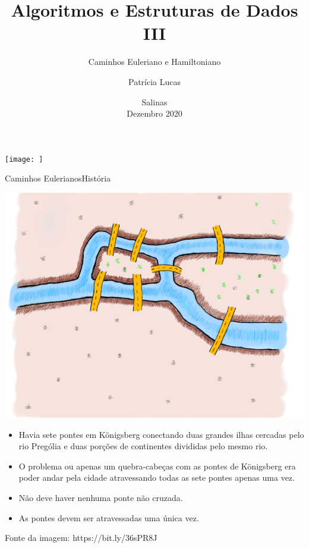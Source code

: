 \documentclass[t]{beamer}
\title[]{Algoritmos e Estruturas de Dados III}
\subtitle[]{Caminhos Euleriano e Hamiltoniano}
\author[]{Patrícia Lucas\\{\footnotesize }}
\institute{Bacharelado em Sistemas de Informação \\ IFNMG  - Campus Salinas}
\date{\scriptsize Salinas\\Dezembro 2020}
\begin{document}
\begin{frame}

\begin{center}
\texttt{[image: ]}
\end{center}
  \titlepage
\end{frame}



\begin{ftst}{Caminhos Eulerianos}{História}
\vone
\vone
\begin{minipage}{.5\textwidth}
    \centering
    \justifying
    \includegraphics[scale=0.23]{Figuras/euleriano_1.png}
\end{minipage}%
\hfill
\begin{minipage}{.5\textwidth}
    \footnotesize
    \justifying
    \begin{itemize}
        \item Havia sete pontes em Königsberg conectando duas grandes ilhas cercadas pelo rio Prególia e duas porções de continentes divididas pelo mesmo rio.
        \item O problema ou apenas um quebra-cabeças com as pontes de Königsberg era poder andar pela cidade atravessando todas as sete pontes apenas uma vez. 
        \item Não deve haver nenhuma ponte não cruzada.
        \item As pontes devem ser atravessadas uma única vez.
    \end{itemize}
\end{minipage}%
\vone
\vone
\tiny
Fonte da imagem: \hypertarget{clique aqui.}{https://bit.ly/36sPR8J}
\end{ftst}
\end{document}
